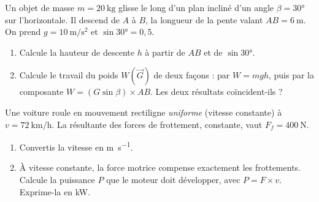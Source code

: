 \documentclass[11pt,a4paper]{article}
\newcommand{\vv}[1]{\vec{#1}}\newcommand{\ds}{\displaystyle}
\begin{document}

\begin{exo}
Un objet de masse $m=\qty{20}{\kilogram}$ glisse le long d'un plan incliné d'un angle $\beta=\ang{30}$
sur l'horizontale. Il descend de $A$ à $B$, la longueur de la pente valant $AB=\qty{6}{\metre}$.
On prend $g=\qty{10}{\metre\per\second\squared}$ et $\sin\ang{30}=0,5$.
\begin{center}
\end{center}
\begin{enumerate}[label=\alph*)]
  \item Calcule la hauteur de descente $h$ à partir de $AB$ et de $\sin\ang{30}$.
  \item Calcule le travail du poids $W(\vv G)$ de deux façons : par $W=mgh$, puis par la composante
        $W=(G\sin\beta)\times AB$. Les deux résultats coïncident-ils ?
\end{enumerate}
\end{exo}

\begin{exo}
Une voiture roule en mouvement rectiligne \emph{uniforme} (vitesse constante) à
$v=\qty{72}{\kilo\metre\per\hour}$. La résultante des forces de frottement, constante, vaut
$F_f=\qty{400}{\newton}$.
\begin{enumerate}[label=\alph*)]
  \item Convertis la vitesse en \si{\metre\per\second}.
  \item À vitesse constante, la force motrice compense exactement les frottements. Calcule la
        puissance $P$ que le moteur doit développer, avec $P=F\times v$. Exprime-la en \si{\kilo\watt}.
\end{enumerate}
\end{exo}
\end{document}
